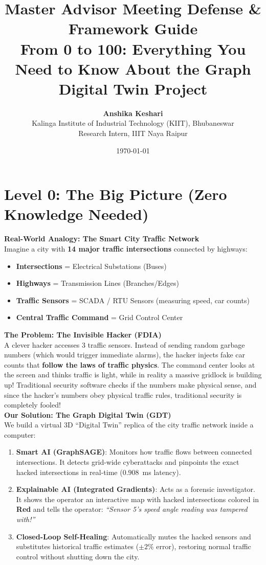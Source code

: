 \documentclass[11pt,a4paper]{article}
\title{\textbf{Master Advisor Meeting Defense \& Framework Guide}\\ \large From 0 to 100: Everything You Need to Know About the Graph Digital Twin Project}
\author{\textbf{Anshika Keshari} \\ Kalinga Institute of Industrial Technology (KIIT), Bhubaneswar \\ Research Intern, IIIT Naya Raipur}
\date{\today}
\begin{document}
\maketitle

\tableofcontents
\newpage

\section{Level 0: The Big Picture (Zero Knowledge Needed)}

\begin{mdframed}[style=analogystyle]
\textbf{Real-World Analogy: The Smart City Traffic Network}\\
Imagine a city with \textbf{14 major traffic intersections} connected by highways:
\begin{itemize}
    \item \textbf{Intersections} = Electrical Substations (Buses)
    \item \textbf{Highways} = Transmission Lines (Branches/Edges)
    \item \textbf{Traffic Sensors} = SCADA / RTU Sensors (measuring speed, car counts)
    \item \textbf{Central Traffic Command} = Grid Control Center
\end{itemize}

\textbf{The Problem: The Invisible Hacker (FDIA)}\\
A clever hacker accesses 3 traffic sensors. Instead of sending random garbage numbers (which would trigger immediate alarms), the hacker injects fake car counts that \textbf{follow the laws of traffic physics}. The command center looks at the screen and thinks traffic is light, while in reality a massive gridlock is building up! Traditional security software checks if the numbers make physical sense, and since the hacker's numbers obey physical traffic rules, traditional security is completely fooled!\\

\textbf{Our Solution: The Graph Digital Twin (GDT)}\\
We build a virtual 3D ``Digital Twin'' replica of the city traffic network inside a computer:
\begin{enumerate}
    \item \textbf{Smart AI (GraphSAGE)}: Monitors how traffic flows between connected intersections. It detects grid-wide cyberattacks and pinpoints the exact hacked intersections in real-time ($0.908$~ms latency).
    \item \textbf{Explainable AI (Integrated Gradients)}: Acts as a forensic investigator. It shows the operator an interactive map with hacked intersections colored in \textbf{Red} and tells the operator: \textit{``Sensor 5's speed angle reading was tampered with!''}
    \item \textbf{Closed-Loop Self-Healing}: Automatically mutes the hacked sensors and substitutes historical traffic estimates ($\pm 2\%$ error), restoring normal traffic control without shutting down the city.
\end{enumerate}
\end{mdframed}
\end{document}
